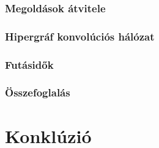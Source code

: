 \subsection{Megoldások átvitele}


\subsection{Hipergráf konvolúciós hálózat}


\subsection{Futásidők}



\subsection{Összefoglalás}

\cleardoublepage
\chapter{Konklúzió}

